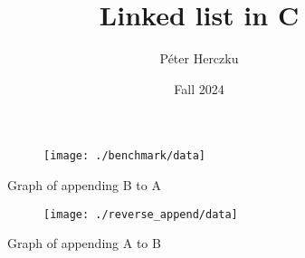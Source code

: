 \documentclass[a4paper,11pt]{article}
\begin{document}
    \title{
        \textbf{Linked list in C}
    }
    \author{Péter Herczku}
    \date{Fall 2024}

    \maketitle

    \begin{figure}[h]
        \centering
        \begin{subfigure}[b]{.5\textwidth}
            \centering
            \texttt{[image: ./benchmark/data]} %
        \end{subfigure}
        \caption{Graph of appending B to A}
        \label{fig:graph_1}
    \end{figure}

    \begin{figure}[h]
        \centering
        \begin{subfigure}[b]{.5\textwidth}
            \centering
            \texttt{[image: ./reverse\_append/data]} %
        \end{subfigure}
        \caption{Graph of appending A to B}
        \label{fig:graph_2}
    \end{figure}
\end{document}
